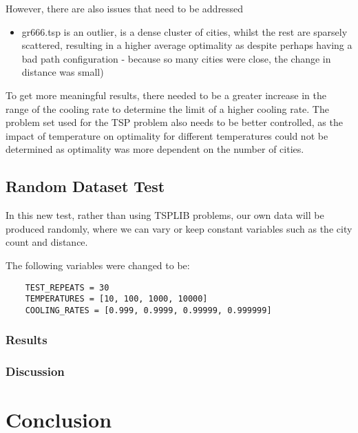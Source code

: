 \documentclass{article}
\begin{document}
However, there are also issues that need to be addressed
\begin{itemize}
    \item gr666.tsp is an outlier, is a dense cluster of cities, whilst the rest are sparsely scattered, resulting in a higher average optimality as despite perhaps having a bad path configuration - because so many cities were close, the change in distance was small)
\end{itemize}

To get more meaningful results, there needed to be a greater increase in the range of the cooling rate to determine the limit of a higher cooling rate.
The problem set used for the TSP problem also needs to be better controlled, as the impact of temperature on optimality for different temperatures could not be determined as optimality was more dependent on the number of cities.

\subsection{Random Dataset Test}
In this new test, rather than using TSPLIB problems, our own data will be produced randomly, where we can vary or keep constant variables such as the city count and distance.

The following variables were changed to be:

\begin{verbatim}
    TEST_REPEATS = 30
    TEMPERATURES = [10, 100, 1000, 10000]
    COOLING_RATES = [0.999, 0.9999, 0.99999, 0.999999]
\end{verbatim}


\subsubsection{Results}

\subsubsection{Discussion}

\newpage
\section{Conclusion}

\newpage
\end{document}
